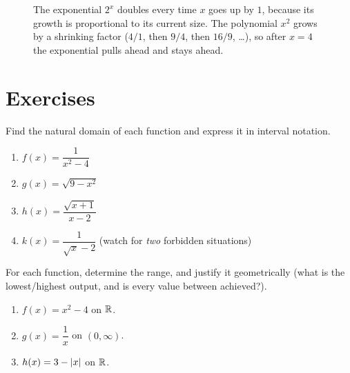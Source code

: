 \begin{figure}[htbp]
\centering
{}
\caption{The exponential $2^x$ doubles every time $x$ goes up by $1$, because its
growth is proportional to its current size. The polynomial $x^2$ grows by a
shrinking factor ($4/1$, then $9/4$, then $16/9$, \ldots), so after $x=4$ the
exponential pulls ahead and stays ahead.}
\label{ch02:fig-poly-vs-exp}
\end{figure}

\section{Exercises}
\label{ch02:exercises}

\begin{exercise}
\label{ch02:exc-domains}
Find the natural domain of each function and express it in interval notation.
\begin{enumerate}
  \item $f(x) = \dfrac{1}{x^2 - 4}$
  \item $g(x) = \sqrt{9 - x^2}$
  \item $h(x) = \dfrac{\sqrt{x+1}}{x - 2}$
  \item $k(x) = \dfrac{1}{\sqrt{x} - 2}$ \quad (watch for \emph{two} forbidden
        situations)
\end{enumerate}
\end{exercise}

\begin{exercise}
\label{ch02:exc-range}
For each function, determine the range, and justify it geometrically (what is the
lowest/highest output, and is every value between achieved?).
\begin{enumerate}
  \item $f(x) = x^2 - 4$ on $\mathbb{R}$.
  \item $g(x) = \dfrac{1}{x}$ on $(0, \infty)$.
  \item $h(x) = 3 - \lvert x\rvert$ on $\mathbb{R}$.
\end{enumerate}
\end{exercise}

